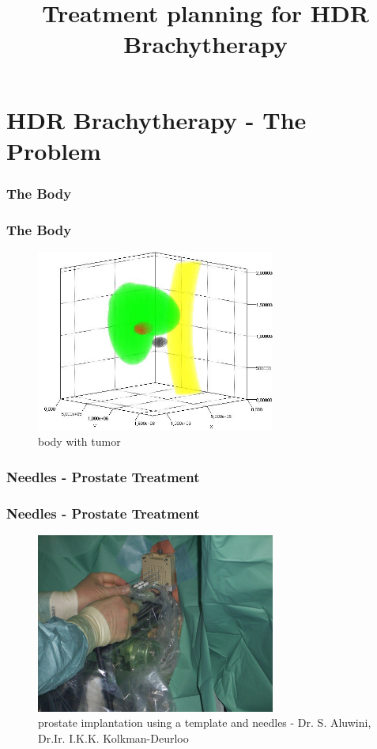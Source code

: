 \documentclass{beamer}
\author[Elm-Karthe-Golebiewski-Schröder-Mordhorst]
{%
   \texorpdfstring{
        \begin{columns}
            \column{.45\linewidth}
            \centering
            \RBox{Elm S.\\
            \href{mailto:sebastian.elm@tuhh.de}{sebastian.elm@tuhh.de}}
            \column{.45\linewidth}
            \centering
            \RBox{Karthe T.\\
            \href{mailto:thobias.karthe@tuhh.de}{thobias.karthe@tuhh.de}}
        \end{columns}            
        \vspace{0.5cm}
        \begin{columns}
            \column{.45\linewidth}
            \centering
            \RBox{Golebiewski D.\\
            \href{mailto:subhamsoni0049@pec.edu}{subhamsoni0049@pec.edu}}
            \column{.45\linewidth}
            \centering
            \RBox{Schröder M.E.\\
            \href{mailto:malte.schroeder@tuhh.de}{malte.schroeder@tuhh.de}}
        \end{columns}
        \vspace{-0.3cm}
        \begin{columns}
          \column{0.3\linewidth}
          \raggedleft
            \vspace{-4.8cm}
            \column{0.6\linewidth}
            \raggedright
            Institute of Medical Technology\\[1.1ex]
            TUHH
            \vspace{-4.8cm}
        \end{columns}
   }
   {John Doe \& Jane Doe}
}
\title{Treatment planning for HDR Brachytherapy}
\begin{document}
\begin{frame}
\titlepage
\end{frame}
\frame{\tableofcontents}

\section{HDR Brachytherapy - The Problem}
\frame{\tableofcontents[currentsection]}
\subsubsection*{The Body}
\begin{frame}
\frametitle{The Body}
\begin{figure}[h] 
  \centering
     \includegraphics[width=0.7\textwidth]{pictures/body.JPG}
  \caption{body with tumor}
  \label{fig:body}
\end{figure}
\end{frame}

\subsubsection*{Needles - Prostate Treatment}
\begin{frame}
\frametitle{Needles - Prostate Treatment}
\begin{figure}[h] 
  \centering
     \includegraphics[width=0.7\textwidth]{pictures/prost.JPG}
  \caption{prostate implantation using a template and needles - Dr. S. Aluwini, Dr.Ir. I.K.K. Kolkman-Deurloo}
  \label{fig:prost}
\end{figure}
\end{frame}
\end{document}
